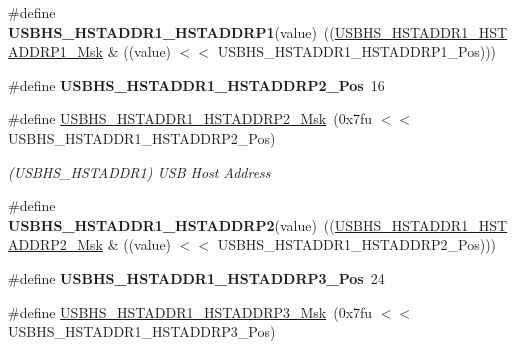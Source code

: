 \begin{DoxyCompactItemize}
\#define {\bfseries U\+S\+B\+H\+S\+\_\+\+H\+S\+T\+A\+D\+D\+R1\+\_\+\+H\+S\+T\+A\+D\+D\+R\+P1}(value)~((\mbox{\hyperlink{group__SAMV71__USBHS_gaf80878790141adcc9d0ef83325a9d64d}{U\+S\+B\+H\+S\+\_\+\+H\+S\+T\+A\+D\+D\+R1\+\_\+\+H\+S\+T\+A\+D\+D\+R\+P1\+\_\+\+Msk}} \& ((value) $<$$<$ U\+S\+B\+H\+S\+\_\+\+H\+S\+T\+A\+D\+D\+R1\+\_\+\+H\+S\+T\+A\+D\+D\+R\+P1\+\_\+\+Pos)))
\item 
\mbox{\label{group__SAME70__USBHS_ga31f13677da4dddc57bc2acd2087af67a}} 
\#define {\bfseries U\+S\+B\+H\+S\+\_\+\+H\+S\+T\+A\+D\+D\+R1\+\_\+\+H\+S\+T\+A\+D\+D\+R\+P2\+\_\+\+Pos}~16
\item 
\mbox{\label{group__SAME70__USBHS_ga58fe50a00c0a40126a2c76fa490f14a4}} 
\#define \mbox{\hyperlink{group__SAME70__USBHS_ga58fe50a00c0a40126a2c76fa490f14a4}{U\+S\+B\+H\+S\+\_\+\+H\+S\+T\+A\+D\+D\+R1\+\_\+\+H\+S\+T\+A\+D\+D\+R\+P2\+\_\+\+Msk}}~(0x7fu $<$$<$ U\+S\+B\+H\+S\+\_\+\+H\+S\+T\+A\+D\+D\+R1\+\_\+\+H\+S\+T\+A\+D\+D\+R\+P2\+\_\+\+Pos)
\begin{DoxyCompactList}\small\item\em (U\+S\+B\+H\+S\+\_\+\+H\+S\+T\+A\+D\+D\+R1) U\+SB Host Address \end{DoxyCompactList}\item 
\mbox{\label{group__SAME70__USBHS_ga2e1c2748d679d354d1179d10e7de6862}} 
\#define {\bfseries U\+S\+B\+H\+S\+\_\+\+H\+S\+T\+A\+D\+D\+R1\+\_\+\+H\+S\+T\+A\+D\+D\+R\+P2}(value)~((\mbox{\hyperlink{group__SAMV71__USBHS_ga58fe50a00c0a40126a2c76fa490f14a4}{U\+S\+B\+H\+S\+\_\+\+H\+S\+T\+A\+D\+D\+R1\+\_\+\+H\+S\+T\+A\+D\+D\+R\+P2\+\_\+\+Msk}} \& ((value) $<$$<$ U\+S\+B\+H\+S\+\_\+\+H\+S\+T\+A\+D\+D\+R1\+\_\+\+H\+S\+T\+A\+D\+D\+R\+P2\+\_\+\+Pos)))
\item 
\mbox{\label{group__SAME70__USBHS_ga6ad9e240e9ea32635c4c3e7cb5245563}} 
\#define {\bfseries U\+S\+B\+H\+S\+\_\+\+H\+S\+T\+A\+D\+D\+R1\+\_\+\+H\+S\+T\+A\+D\+D\+R\+P3\+\_\+\+Pos}~24
\item 
\mbox{\label{group__SAME70__USBHS_gac393d1ef7204508fbd9ff3028522ffbd}} 
\#define \mbox{\hyperlink{group__SAME70__USBHS_gac393d1ef7204508fbd9ff3028522ffbd}{U\+S\+B\+H\+S\+\_\+\+H\+S\+T\+A\+D\+D\+R1\+\_\+\+H\+S\+T\+A\+D\+D\+R\+P3\+\_\+\+Msk}}~(0x7fu $<$$<$ U\+S\+B\+H\+S\+\_\+\+H\+S\+T\+A\+D\+D\+R1\+\_\+\+H\+S\+T\+A\+D\+D\+R\+P3\+\_\+\+Pos)

\end{DoxyCompactItemize}
